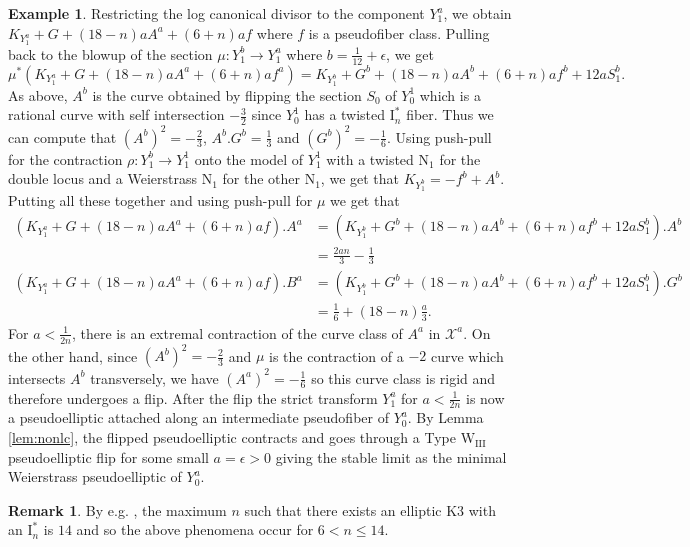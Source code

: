 \documentclass[11pt]{amsart}
\theoremstyle{definition}
\newtheorem{example}[theorem]{Example}
\newtheorem{remark}[theorem]{Remark}
\theoremstyle{remark}
\begin{document}
\begin{example}
		Restricting the log canonical divisor to the component $Y_1^a $, we obtain $K_{Y_1^a} + G + (18 - n)aA^a + (6+n)af$ where $f$ is a pseudofiber class. Pulling back to the blowup of the section $\mu : Y_1^{b} \to Y_1^a$ where $b = \frac{1}{12} + \epsilon$, we get
		$$
		\mu^*(K_{Y_1^a} + G + (18 - n)aA^a + (6 + n)af^a) = K_{Y_1^b} + G^b + (18 - n)aA^b + (6 + n)af^b + 12aS_1^b.
		$$
		As above, $A^b$ is the curve obtained by flipping the section $S_0$ of $Y_0^1$ which is a rational curve with self intersection $-\frac{3}{2}$ since $Y_0^1$ has a twisted $\mathrm{I}_n^*$ fiber. Thus we can compute that $(A^b)^2 = -\frac{2}{3}$, $A^b.G^b = \frac{1}{3}$ and $(G^b)^2 = -\frac{1}{6}$. Using push-pull for the contraction $\rho : Y_1^b \to Y_1^1$ onto the model of $Y_1^1$ with a twisted $\mathrm{N}_1$ for the double locus and a Weierstrass $\mathrm{N}_1$ for the other $\mathrm{N}_1$, we get that $K_{Y_1^b} = -f^b + A^b$. Putting all these together and using push-pull for $\mu$ we get that 
		\begin{align*}
			(K_{Y_1^a} + G + (18 - n)aA^a + (6 + n)af).A^a &= (K_{Y_1^b} + G^b + (18 - n)aA^b + (6 + n)af^b + 12aS_1^b).A^b \\ &= 
			\frac{2an}{3} - \frac{1}{3}  \\
			(K_{Y_1^a} + G + (18 - n)aA^a + (6 + n)af).B^a &= (K_{Y_1^b} + G^b + (18 - n)aA^b + (6 + n)af^b + 12aS_1^b).G^b \\ & = \frac{1}{6} + (18 - n)\frac{a}{3}.
		\end{align*}
		For $a < \frac{1}{2n}$, there is an extremal contraction of the curve class of $A^a$ in $\mathscr{X}^a$. On the other hand, since $(A^b)^2 = -\frac{2}{3}$ and $\mu$ is the contraction of a $-2$ curve which intersects $A^b$ transversely, we have $(A^a)^2 = -\frac{1}{6}$ so this curve class is rigid and therefore undergoes a flip. After the flip the strict transform $Y_1^a$ for $a < \frac{1}{2n}$ is now a pseudoelliptic attached along an intermediate pseudofiber of $Y_0^a$. By Lemma \ref{lem:nonlc}, the flipped pseudoelliptic contracts and goes through a Type $\mathrm{W}_\mathrm{III}$ pseudoelliptic flip for some small $a = \epsilon >0$ giving the stable limit as the minimal Weierstrass pseudoelliptic of $Y_0^a$. 
		
	\end{example}
	\begin{remark} By e.g. \cite{shioda}, the maximum $n$ such that there exists an elliptic K3 with an $\mathrm{I}_n^*$ is $14$ and so the above phenomena occur for $6 < n \le 14$.
	\end{remark} 
	
\end{document}
